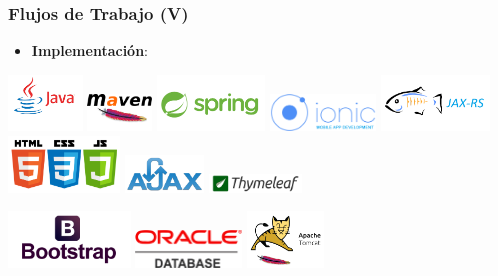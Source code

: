 \documentclass[usenames,dvipsnames]{beamer}
\begin{document}
\begin{frame}
\frametitle{Flujos de Trabajo (V)}

\begin{itemize}
\item \textbf{Implementación}:
\end{itemize}
\vspace{-0.5cm}
\begin{center}
\includegraphics[height=1.5cm, angle=10]{./img/java.png}
\includegraphics[height=1cm]{./img/maven.png}
\includegraphics[height=1.5cm, angle=8]{./img/spring.png}
\includegraphics[height=1cm, angle=-5]{./img/ionic.png}
\includegraphics[height=1.5cm, angle=-5]{./img/jaxrs.png}
\includegraphics[height=1.5cm, angle=-5]{./img/htmlcssjs.png}
\includegraphics[height=1cm, angle=5]{./img/ajax.png}
\includegraphics[height=0.5cm, angle=5]{./img/thymeleaf.png}

\includegraphics[height=1.5cm, angle=12]{./img/bootstrap.png}
\includegraphics[height=1cm]{./img/oracledb.png}
\includegraphics[height=1.5cm, angle=-5]{./img/tomcat.png}
\end{center}
\end{frame}
\end{document}
